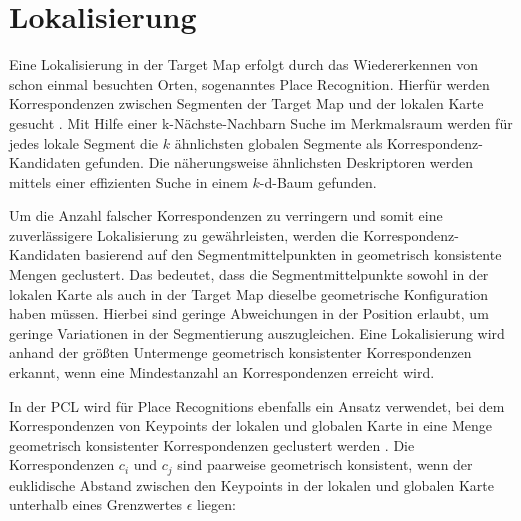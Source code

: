 \section[Lokalisierung (Kopp)]{Lokalisierung}                                                                                                                                                                                                                                                                                                                                                                                                                                                                                                                                                                                                                                                                                                                                                                                                                                                                    
\label{sec:lokalisierung}

Eine Lokalisierung in der Target Map erfolgt durch das Wiedererkennen von schon einmal besuchten Orten, sogenanntes Place Recognition. Hierfür werden Korrespondenzen zwischen Segmenten der Target Map und der lokalen Karte gesucht \cite{Dube2018}. Mit Hilfe einer k-Nächste-Nachbarn Suche im Merkmalsraum werden für jedes lokale Segment die $ k $ ähnlichsten globalen Segmente als Korrespondenz-Kandidaten gefunden. Die näherungsweise ähnlichsten Deskriptoren werden mittels einer effizienten Suche in einem $k$-d-Baum gefunden. 

Um die Anzahl falscher Korrespondenzen zu verringern und somit eine zuverlässigere Lokalisierung zu gewährleisten, werden die Korrespondenz-Kandidaten basierend auf den Segmentmittelpunkten in geometrisch konsistente Mengen geclustert. Das bedeutet, dass die Segmentmittelpunkte sowohl in der lokalen Karte als auch in der Target Map dieselbe geometrische Konfiguration haben müssen. Hierbei sind geringe Abweichungen in der Position erlaubt, um geringe Variationen in der Segmentierung auszugleichen. Eine Lokalisierung wird anhand der größten Untermenge geometrisch konsistenter Korrespondenzen erkannt, wenn eine Mindestanzahl an Korrespondenzen erreicht wird. 

In der PCL wird für Place Recognitions ebenfalls ein Ansatz verwendet, bei dem Korrespondenzen von Keypoints der lokalen und globalen Karte in eine Menge geometrisch konsistenter Korrespondenzen geclustert werden \cite{Gollub2017}. Die Korrespondenzen $ c_i $ und $ c_j $ sind paarweise geometrisch konsistent, wenn der euklidische Abstand zwischen den Keypoints in der lokalen und globalen Karte unterhalb eines Grenzwertes $ \epsilon $ liegen: 

